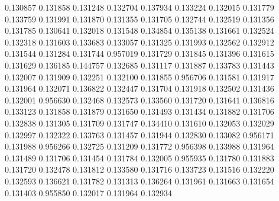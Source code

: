 0.130857
0.131858
0.131248
0.132704
0.137934
0.133224
0.132015
0.131779
0.133759
0.131991
0.131870
0.131355
0.131705
0.132744
0.132519
0.131356
0.131785
0.130641
0.132018
0.131548
0.134854
0.135138
0.131661
0.132524
0.132318
0.131603
0.133683
0.133057
0.131325
0.131993
0.132562
0.132912
0.131544
0.131284
0.131744
0.957019
0.131729
0.131845
0.131396
0.131615
0.131629
0.136185
0.144757
0.132685
0.131117
0.131887
0.133783
0.131443
0.132007
0.131909
0.132251
0.132100
0.131855
0.956706
0.131581
0.131917
0.131964
0.132071
0.136822
0.132447
0.131704
0.131918
0.132502
0.131436
0.132001
0.956630
0.132468
0.132573
0.133560
0.131720
0.131641
0.136816
0.133123
0.131858
0.131879
0.131650
0.131493
0.131434
0.131882
0.131706
0.132838
0.131305
0.131709
0.131747
0.134410
0.131610
0.132053
0.132029
0.132997
0.132322
0.133763
0.131457
0.131944
0.132830
0.133082
0.956171
0.131988
0.956266
0.132725
0.131209
0.131772
0.956398
0.133988
0.131964
0.131489
0.131706
0.131454
0.131784
0.132005
0.955935
0.131780
0.131883
0.131720
0.132478
0.131812
0.133580
0.131716
0.133723
0.131516
0.132220
0.132593
0.136621
0.131782
0.131313
0.136264
0.131961
0.131663
0.131654
0.131403
0.955850
0.132017
0.131964
0.132934
